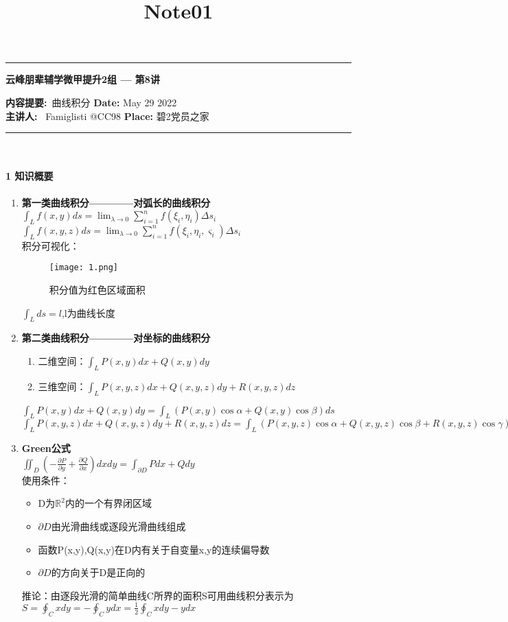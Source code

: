 \documentclass[12pt]{scrartcl}
\title{Note01}
\begin{document}
\begin{center}
	\hrule
	\vspace{.4cm}
	{\textbf { \large 云峰朋辈辅学微甲提升2组 --- 第8讲}}
\end{center}
{\textbf{内容提要:}\ 曲线积分 \hspace{\fill} \textbf{Date:} May 29 2022    \\
{ \textbf{主讲人:}} \ Famiglisti @CC98  \hspace{\fill} \textbf{Place:} 碧2党员之家 \\
	\hrule
~\\


\paragraph*{\large 1 知识概要}\leavevmode \newline

\begin{enumerate}
    \item \textbf{第一类曲线积分————对弧长的曲线积分}\\
    $\int_L f(x,y)ds=\lim_{\lambda  \to 0}\sum_{i = 1}^{n}f(\xi _i,\eta _i)\Delta s_i  $\\
    $\int_L f(x,y,z)ds=\lim_{\lambda  \to 0}\sum_{i = 1}^{n}f(\xi _i,\eta _i,\varsigma _i)\Delta s_i  $\\
    积分可视化：
    \begin{figure}[H]
        \centering
        \texttt{[image: 1.png]}
        \caption{积分值为红色区域面积}
        \end{figure}
  $\int_L ds=l  $,l为曲线长度
    \item \textbf{第二类曲线积分————对坐标的曲线积分}
    \begin{enumerate}
        \item 二维空间：$\int _LP(x,y)dx+Q(x,y)dy$
        \item 三维空间：$\int _LP(x,y,z)dx+Q(x,y,z)dy+R(x,y,z)dz$
    \end{enumerate}
    $\int _LP(x,y)dx+Q(x,y)dy=\int _L(P(x,y)\cos \alpha+Q(x,y)\cos \beta) ds$\\
    $\int _LP(x,y,z)dx+Q(x,y,z)dy+R(x,y,z)dz=\int _L(P(x,y,z)\cos \alpha+Q(x,y,z)\cos \beta+R(x,y,z)\cos \gamma ) ds$
    \item \textbf{Green公式}\\
    $\iint_D(-\frac{\partial P}{\partial y}+\frac{\partial Q}{\partial x})dxdy=\int _{\partial D}Pdx+Qdy$\\
    使用条件：
    \begin{itemize}
        \item D为$\mathbb{R} ^2$内的一个有界闭区域
        \item $\partial D$由光滑曲线或逐段光滑曲线组成
        \item 函数P(x,y),Q(x,y)在D内有关于自变量x,y的连续偏导数
        \item $\partial D$的方向关于D是正向的
    \end{itemize}
    推论：由逐段光滑的简单曲线C所界的面积S可用曲线积分表示为$S=\oint _Cxdy=-\oint _Cydx=\frac{1}{2}\oint _Cxdy-ydx$
\end{enumerate}



}
\end{document}
